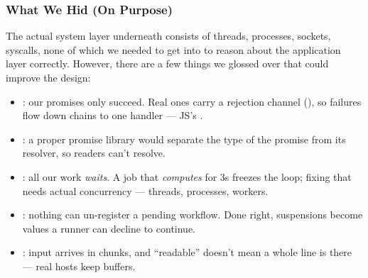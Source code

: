\documentclass[aspectratio=169]{beamer}
\begin{document}



\begin{frame}[fragile]
  \frametitle{What We Hid (On Purpose)}

  The actual system layer underneath consists of threads, processes,
  sockets, syscalls, none of which we needed to get into to reason
  about the application layer correctly. However, there are a few things
  we glossed over that could improve the design:

  \pause

  \begin{itemize}
    \item {}: our promises only succeed. Real ones carry a
      rejection channel (), so failures flow down
      chains to one handler --- JS's .
    \item {}: a proper promise library would separate the
      type of the promise from its resolver, so readers can't resolve.
    \item {}: all our work \textit{waits}. A job
      that \textit{computes} for 3s freezes the loop; fixing that needs
      actual concurrency --- threads, processes, workers.
    \item {}: nothing can un-register a pending
      workflow. Done right, suspensions become values a runner can
      decline to continue.
    \item {}: input arrives in chunks, and
      ``readable'' doesn't mean a whole line is there --- real hosts
      keep buffers.
  \end{itemize}
\end{frame}
\end{document}
